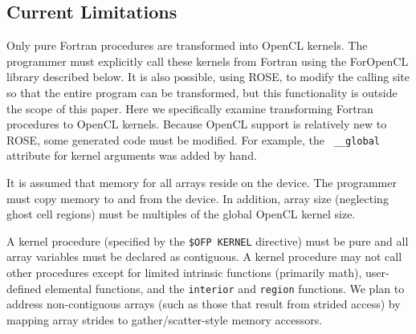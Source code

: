 \subsection{Current Limitations}

Only pure Fortran procedures are transformed into OpenCL kernels.  The
programmer must explicitly call these kernels from Fortran using the
ForOpenCL library described below.  It is also possible, using ROSE,
to modify the calling site so that the entire program can be
transformed, but this functionality is outside the scope of this
paper.  Here we specifically examine transforming Fortran procedures
to OpenCL kernels.  Because OpenCL support is relatively new to ROSE,
some generated code must be modified.  For example, the {\tt
  \_\_global} attribute for kernel arguments was added by hand.

It is assumed that memory for all arrays reside on the device.  The
programmer must copy memory to and from the device.  In addition,
array size (neglecting ghost cell regions) must be multiples of the
global OpenCL kernel size.


A kernel procedure (specified by the {\tt \!\$OFP KERNEL} directive) must be
pure and all array variables must be declared as contiguous.  A kernel
procedure may not call other procedures except for limited intrinsic
functions (primarily math), user-defined elemental functions, and the
{\tt interior} and {\tt region} functions.  We plan to address
non-contiguous arrays (such as those that result from strided access)
by mapping array strides to gather/scatter-style memory accessors.
